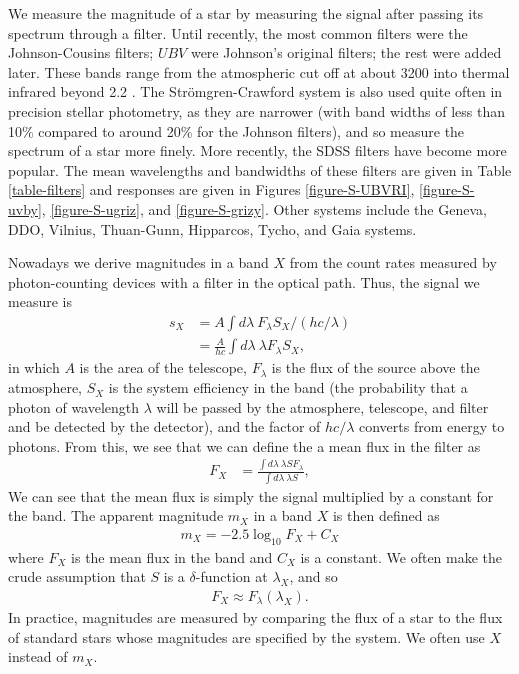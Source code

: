 We measure the magnitude of a star by measuring the signal
after passing its spectrum through a filter. Until recently, the most common
filters were the Johnson-Cousins filters; $UBV$ were
Johnson's original filters; the rest were added later. These
bands range from the atmospheric cut off at about 3200 {\Angstrom}
into thermal infrared beyond 2.2 {\micron}. The Strömgren-Crawford system is also used quite often in precision
stellar photometry, as they are narrower (with band widths
of less than 10\% compared to around 20\% for the Johnson
filters), and so measure the spectrum of a star more finely. More recently, the SDSS filters have become more popular.
The mean wavelengths and bandwidths of these filters are
given in Table \ref{table-filters} and responses are given in Figures \ref{figure-S-UBVRI}, \ref{figure-S-uvby}, \ref{figure-S-ugriz}, and \ref{figure-S-grizy}. Other systems include the
Geneva, DDO, Vilnius, Thuan-Gunn, Hipparcos, Tycho, and Gaia systems.

\newslide

Nowadays we derive magnitudes in a band $X$ from the count rates measured by photon-counting devices with a filter in the optical path. Thus, the signal we measure is 
\begin{align}
s_X &= A \int\!d\lambda\: F_\lambda S_X / (hc/\lambda)\\
&= \frac{A}{hc} \int\!d\lambda\: \lambda F_\lambda S_X,
\end{align}
in which $A$ is the area of the telescope, $F_\lambda$ is the flux of the source above the atmosphere, $S_X$ is the system efficiency in the band (the probability that a photon of wavelength $\lambda$ will be passed by the atmosphere, telescope, and filter and be detected by the detector), and the factor of $hc/\lambda$ converts from energy to photons.
From this, we see that we can define the a mean flux in the filter as 
\begin{align}
F_X &= \frac{\int\!d\lambda\:\lambda S F_\lambda}{\int\!d\lambda\:\lambda S},
\end{align}
We can see that the mean flux is simply the signal multiplied by a constant for the band.
The apparent magnitude $m_X$ in a band $X$ is then defined as
\begin{align}
m_X = -2.5 \log_{10} F_X + C_X
\end{align}
where $F_X$ is the mean flux in the band and $C_X$ is a constant. 
We often make the crude assumption that $S$ is a $\delta$-function at $\lambda_X$, and so
\begin{align}
F_X \approx F_\lambda(\lambda_X).
\end{align}
In practice, magnitudes are measured by comparing the flux of a star
to the flux of standard stars whose magnitudes are specified by
the system. We often use $X$ instead of $m_X$.

